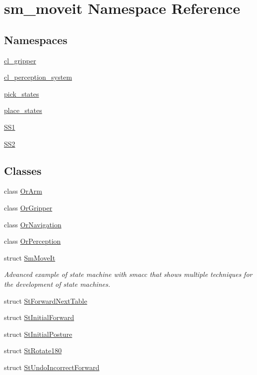 \hypertarget{namespacesm__moveit}{}\section{sm\+\_\+moveit Namespace Reference}
\label{namespacesm__moveit}
\subsection*{Namespaces}
\begin{DoxyCompactItemize}
\item 
 \hyperlink{namespacesm__moveit_1_1cl__gripper}{cl\+\_\+gripper}
\item 
 \hyperlink{namespacesm__moveit_1_1cl__perception__system}{cl\+\_\+perception\+\_\+system}
\item 
 \hyperlink{namespacesm__moveit_1_1pick__states}{pick\+\_\+states}
\item 
 \hyperlink{namespacesm__moveit_1_1place__states}{place\+\_\+states}
\item 
 \hyperlink{namespacesm__moveit_1_1SS1}{S\+S1}
\item 
 \hyperlink{namespacesm__moveit_1_1SS2}{S\+S2}
\end{DoxyCompactItemize}
\subsection*{Classes}
\begin{DoxyCompactItemize}
\item 
class \hyperlink{classsm__moveit_1_1OrArm}{Or\+Arm}
\item 
class \hyperlink{classsm__moveit_1_1OrGripper}{Or\+Gripper}
\item 
class \hyperlink{classsm__moveit_1_1OrNavigation}{Or\+Navigation}
\item 
class \hyperlink{classsm__moveit_1_1OrPerception}{Or\+Perception}
\item 
struct \hyperlink{structsm__moveit_1_1SmMoveIt}{Sm\+Move\+It}
\begin{DoxyCompactList}\small\item\em Advanced example of state machine with smacc that shows multiple techniques for the development of state machines. \end{DoxyCompactList}\item 
struct \hyperlink{structsm__moveit_1_1StForwardNextTable}{St\+Forward\+Next\+Table}
\item 
struct \hyperlink{structsm__moveit_1_1StInitialForward}{St\+Initial\+Forward}
\item 
struct \hyperlink{structsm__moveit_1_1StInitialPosture}{St\+Initial\+Posture}
\item 
struct \hyperlink{structsm__moveit_1_1StRotate180}{St\+Rotate180}
\item 
struct \hyperlink{structsm__moveit_1_1StUndoIncorrectForward}{St\+Undo\+Incorrect\+Forward}
\end{DoxyCompactItemize}
